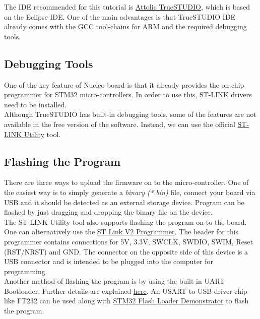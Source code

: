 \documentclass[a4paper,12pt,oneside]{book}
\begin{document}
The IDE recommended for this tutorial is \href{https://atollic.com/resources/download/}{Attolic TrueSTUDIO}, which is based on the Eclipse IDE. One of the main advantages is that TrueSTUDIO IDE already comes with the GCC tool-chains for ARM and the required debugging tools.\\ 

\subsection{Debugging Tools}
\label{ssec:stmdebug}
One of the key feature of Nucleo board is that it already provides the on-chip programmer for STM32 micro-controllers. In order to use this, \href{http://www.st.com/en/embedded-software/stsw-link009.html}{ST-LINK drivers} need to be installed.\\

Although TrueSTUDIO has built-in debugging tools, some of the features are not available in the free version of the software. Instead, we can use the official \href{http://www.st.com/en/embedded-software/stsw-link004.html}{ST-LINK Utility} tool.\\

\subsection{Flashing the Program}
There are three ways to upload the firmware on to the micro-controller. One of the easiest way is to simply generate a \textit{binary (*.bin)} file, connect your board via USB and it should be detected as an external storage device. Program can be flashed by just dragging and dropping the binary file on the device.\\

The ST-LINK Utility tool also supports flashing the program on to the board. One can alternatively use the \href{http://www.amazon.in/xcluma-St-Link-Stlink-Emulator-Downloader/dp/B072TFSGW7/ref=sr_1_1?ie=UTF8&qid=1499104526&sr=8-1&keywords=st+link}{ST Link V2 Programmer}. The header for this programmer contains connections for 5V, 3.3V, SWCLK, SWDIO, SWIM, Reset (RST/NRST) and GND. The connector on the opposite side of this device is a USB connector and is intended to be plugged into the computer for programming.\\

Another method of flashing the program is by using the built-in UART Bootloader. Further details are explained \href{http://www.scienceprog.com/flashing-programs-to-stm32-embedded-bootloader/}{here}. An USART to USB driver chip like FT232 can be used along with \href{http://www.st.com/en/development-tools/flasher-stm32.html}{STM32 Flash Loader Demonstrator} to flash the program.\\ 
\end{document}
